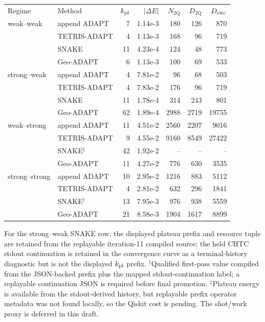 \documentclass[
  reprint,
  amsmath,
  amssymb,
  aps,
  pra,
  nofootinbib,
  superscriptaddress,
  floatfix
]{revtex4-2}
\newcommand{\twq}{\mathrm{2Q}}
\begin{document}
\begin{widetext}
\begin{minipage}{\textwidth}
\begin{center}
\begin{ruledtabular}
\begin{tabular}{p{}p{}rrrrr}
Regime & Method & $k_{\rm pl}$ & $|\Delta E|$ & $N_{\twq}$ & $D_{\twq}$ & $D_{\rm circ}$ \\
\colrule
weak--weak & append ADAPT & 7 & 1.14e-3 & 180 & 126 & 870 \\
 & TETRIS-ADAPT & 4 & 1.13e-3 & 168 & 96 & 719 \\
 & SNAKE & 11 & 4.23e-4 & 124 & 48 & 773 \\
 & Geo-ADAPT & 6 & 1.13e-3 & 100 & 69 & 533 \\
\colrule
strong--weak & append ADAPT & 4 & 7.81e-2 & 96 & 68 & 503 \\
 & TETRIS-ADAPT & 4 & 7.83e-2 & 176 & 96 & 719 \\
 & SNAKE & 11 & 1.78e-4 & 314 & 243 & 801 \\
 & Geo-ADAPT & 62 & 1.89e-4 & 2988 & 2719 & 19755 \\
\colrule
weak--strong & append ADAPT & 11 & 4.51e-2 & 2560 & 2207 & 9016 \\
 & TETRIS-ADAPT & 9 & 4.55e-2 & 9160 & 8549 & 27422 \\
 & SNAKE$^\ddagger$ & 42 & 1.92e-2 & -- & -- & -- \\
 & Geo-ADAPT & 11 & 4.27e-2 & 776 & 630 & 3535 \\
\colrule
strong--strong & append ADAPT & 10 & 2.95e-2 & 1216 & 883 & 5112 \\
 & TETRIS-ADAPT & 4 & 2.81e-2 & 632 & 296 & 1841 \\
 & SNAKE$^\dagger$ & 13 & 7.95e-3 & 976 & 938 & 5559 \\
 & Geo-ADAPT & 21 & 8.58e-3 & 1904 & 1617 & 8899 \\
\end{tabular}
\end{ruledtabular}
\end{center}
\vspace{-0.4ex}
\noindent\footnotesize{For the strong--weak SNAKE row, the displayed plateau prefix and resource tuple are retained from the replayable iteration-11 compiled source; the held CHTC stdout continuation is retained in the convergence curve as a terminal-history diagnostic but is not the displayed \(k_{\rm pl}\) prefix. $^\dagger$Qualified first-pass value compiled from the JSON-backed prefix plus the mapped stdout-continuation label; a replayable continuation JSON is required before final promotion. $^\ddagger$Plateau energy is available from the stdout-derived history, but replayable prefix operator metadata was not found locally, so the Qiskit cost is pending. The shot/work proxy is deferred in this draft.}
\end{minipage}
\par\addvspace{1.0ex}


\end{widetext}
\end{document}
